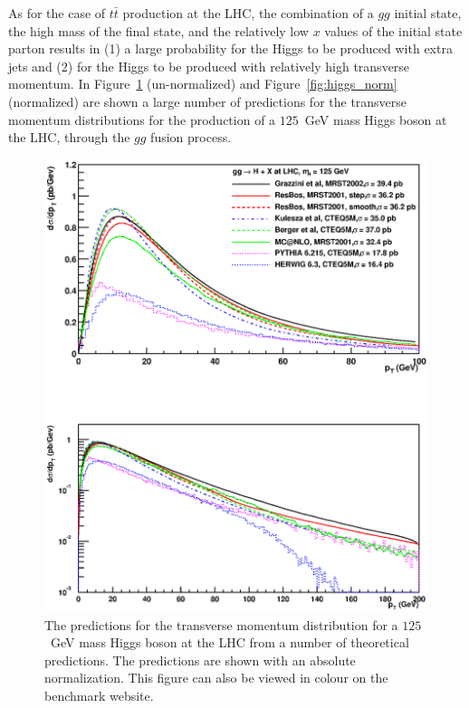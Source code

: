 \documentclass[12pt]{iopart}
\begin{document}
As for the case of $t\bar{t}$ production at the LHC, the combination of a $gg$ initial state, the high mass of the final state, and the relatively low $x$ values of the initial state parton results in (1) a large probability for the Higgs to be produced with extra jets and (2) for the Higgs to be produced with relatively high transverse momentum. 
In Figure~\ref{fig:higgs_no_norm} (un-normalized) and Figure~\ref{fig:higgs_norm} (normalized) are shown a large
number of predictions for the transverse momentum distributions for the production of a $125$~GeV mass Higgs boson
at the LHC, through the $gg$ fusion process.
%
\begin{figure}[t]
\begin{center}
\includegraphics[width=12cm]{higgs_pt_comparison_all_no_norm.eps}
\end{center}
\vspace*{-1cm}
\caption{
The predictions for the transverse momentum distribution for a $125$~GeV mass Higgs boson at the LHC
from a number of theoretical predictions. The predictions are shown with an absolute normalization.
This figure can also be viewed in colour on the benchmark website. 
\label{fig:higgs_no_norm}
}
\end{figure}
%
%
\end{document}
